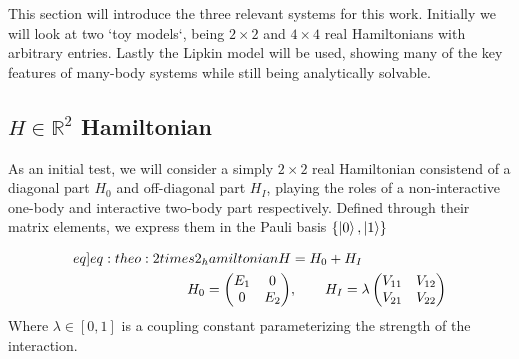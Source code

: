 This section will introduce the three relevant systems for this work. Initially we will look at two `toy models`, being $2\times2$ and $4 \times 4$ real Hamiltonians with arbitrary entries. Lastly the Lipkin model will be used, showing many of the key features of many-body systems while still being analytically solvable.   

\subsection{$H \in \mathbb{R}^2$ Hamiltonian}
As an initial test, we will consider a simply $2\times 2$ real Hamiltonian consistend of a diagonal part $H_0$ and off-diagonal part $H_I$, playing the roles of a non-interactive one-body and interactive two-body part respectively. Defined through their matrix elements, we express them in the Pauli basis $\{\ket{0},\ket{1}\}$

\begin{align}
    \begin{split} \label[eq]{eq:theo:2times2_hamiltonian}
        H &= H_0 + H_I \\
        H_0 = \begin{pmatrix}
            E_1 & 0 \\
            0 & E_2
        \end{pmatrix}&, \hspace{20px}
        H_I = \lambda \begin{pmatrix}
            V_{11} & V_{12} \\
            V_{21} & V_{22}
        \end{pmatrix}
    \end{split}
\end{align}
Where $\lambda \in [0,1]$ is a coupling constant parameterizing the strength of the interaction. 

